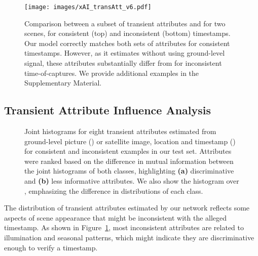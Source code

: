 \documentclass[journal]{IEEEtran}
\begin{document}
        
        \begin{figure}[!t]
            \centering
            \texttt{[image: images/xAI\_transAtt\_v6.pdf]}
            \caption{Comparison between a subset of transient attributes  and  for two scenes, for consistent (top) and inconsistent (bottom) timestamps. Our model correctly matches both sets of attributes for consistent timestamps. However, as it estimates  without using ground-level signal, these attributes substantially differ from  for inconsistent time-of-captures. We provide additional examples in the Supplementary Material.}
            \label{fig:xai_transient}
        \end{figure}


        
    \subsection{Transient Attribute Influence Analysis}
    
        \begin{figure*}[!t]
            \centering
            \hfill
            \caption{Joint histograms for eight transient attributes estimated from ground-level picture () or satellite image, location and timestamp () for consistent and inconsistent examples in our test set. Attributes were ranked based on the difference in mutual information between the joint histograms of both classes, highlighting \textbf{(a)} discriminative and \textbf{(b)} less informative attributes. We also show the histogram over , emphasizing the difference in distributions of each class.}
            \label{fig:ta_hist}
            \vspace{-0.3cm}
        \end{figure*}
    
        The distribution of transient attributes estimated by our network reflects some aspects of scene appearance that might be inconsistent with the alleged timestamp. As shown in Figure~\ref{fig:xai_transient}, most inconsistent attributes are related to illumination and seasonal patterns, which might indicate they are discriminative enough to verify a timestamp.     
        
\end{document}
